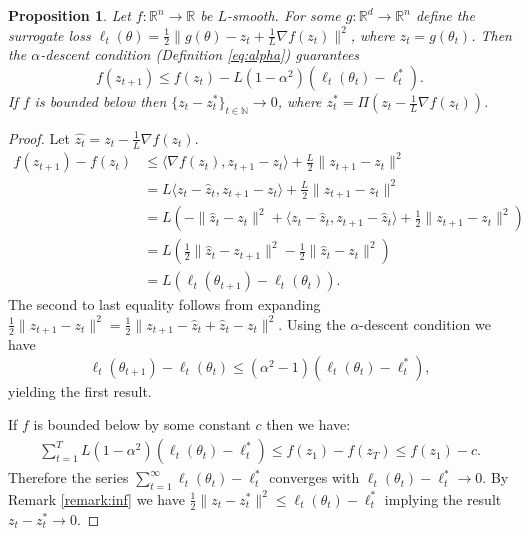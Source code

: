 \documentclass{article} %
\newtheorem{proposition}[theorem]{Proposition}
\theoremstyle{definition}
\newcommand{\reals}{\mathbb{R}}
\newcommand{\nnumbers}{\mathbb{N}}
\newcommand{\inner}[2]{\langle #1, #2 \rangle}
\begin{document}
\begin{proposition}\label{thm:alpha-scalar}
    Let $f: \reals^n \to \reals$ be $L$-smooth.
    For some $g: \reals^d \to \reals^n$ define the surrogate loss $\ell_t(\theta) = \frac{1}{2}\|g(\theta)-z_t+\frac{1}{L}\nabla f(z_t)\|^2$,
    where $z_t = g(\theta_t)$.
    Then the $\alpha$-descent condition (Definition \ref{eq:alpha}) guarantees
    \[
    f(z_{t+1}) \leq f(z_t) -L(1-\alpha^2)(\ell_t(\theta_t)- \ell_t^\ast).
    \]
    If $f$ is bounded below then $\{z_t - z_{t}^\ast\}_{t\in \nnumbers}\to 0$, where $z_t^\ast = \Pi(z_t - \frac{1}{L}\nabla f(z_t))$.
\end{proposition}
\begin{proof}
    Let $\hat{z_t} = z_t- \frac{1}{L}\nabla f(z_t)$.
    \begin{align*}
        f(z_{t+1}) - f(z_t) &\leq \inner{\nabla f(z_t)}{z_{t+1}-z_t} + \frac{L}{2}\|z_{t+1}-z_t\|^2\\
        &= L\inner{z_t-\hat{z}_t}{z_{t+1}-z_t}+ \frac{L}{2}\|z_{t+1}-z_t\|^2\\
        &=L\left(-\|\hat{z}_t - z_t\|^2 +\inner{z_t-\hat{z}_t}{z_{t+1}-\hat{z}_t} + \frac{1}{2}\|z_{t+1}-z_t\|^2\right)\\
        &=L\left(\frac{1}{2}\|\hat{z}_t-z_{t+1}\|^2-\frac{1}{2}\|\hat{z}_t-z_t\|^2 \right)\\
        &=L\left(\ell_t(\theta_{t+1})-\ell_{t}(\theta_t) \right).
    \end{align*}
    The second to last equality follows from  expanding $\frac{1}{2}\|z_{t+1} -z_t\|^2 = \frac{1}{2}\|z_{t+1}-\hat{z}_t +\hat{z}_t- z_t\|^2$.
    Using the $\alpha$-descent condition we have
    \[
    \ell_t(\theta_{t+1}) -\ell_{t}(\theta_t) \leq (\alpha^2-1)( \ell_t(\theta_t) -\ell_t^\ast),
    \]
    yielding the first result.

    If $f$ is bounded below by some constant $c$ then we have:
    \begin{align*}
        \sum_{t=1}^T L(1-\alpha^2)(\ell_t(\theta_t)- \ell_t^\ast) \leq f(z_1)-f(z_T) \leq f(z_1)-c.
    \end{align*}
    Therefore the series $\sum_{t=1}^\infty\ell_t(\theta_t)- \ell_t^\ast$ converges with $\ell_t(\theta_t)- \ell_t^\ast \to 0$.
    By Remark \ref{remark:inf} we have  $\frac{1}{2}\|z_t - z_t^\ast\|^2 \leq \ell_t(\theta_t)- \ell_t^\ast$ implying the result $z_t - z_t^\ast \to 0$.
\end{proof}
\end{document}
